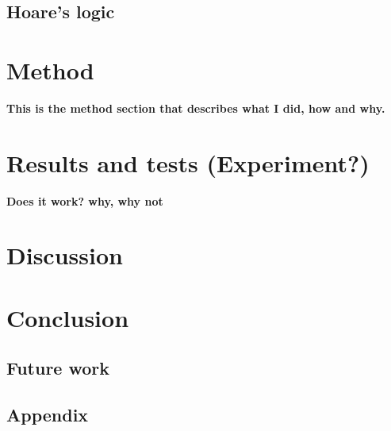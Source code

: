 \documentclass[a4paper]{report}
\begin{document}
\section{Hoare's logic}
\chapter{Method}
\textbf{This is the method section that describes what I did, how and why.}
\chapter{Results and tests (Experiment?)}
\textbf{Does it work? why, why not}
\chapter{Discussion}

\chapter{Conclusion}
\section{Future work}

\newpage



\section{Appendix}
\end{document}
